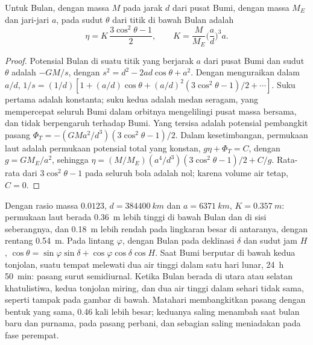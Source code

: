 \begin{theorem}\label{thm:b3:ocean-dynamics:equilibrium-tide}
Untuk Bulan, dengan massa $M$ pada jarak $d$ dari pusat Bumi, dengan
massa $M_E$ dan jari-jari $a$,  pada sudut $\theta$ dari
titik di bawah Bulan adalah
\[
\eta = K\,\frac{3\cos^2\theta - 1}{2},\qquad
K = \frac{M}{M_E}\Big(\frac{a}{d}\Big)^3 a .
\]
\end{theorem}

\begin{proof}
Potensial Bulan di suatu titik yang berjarak $a$ dari
pusat Bumi dan sudut $\theta$ adalah $-GM/s$, dengan $s^2 = d^2 - 2ad\cos\theta +
a^2$. Dengan menguraikan dalam $a/d$, $1/s = (1/d)[1 + (a/d)\cos\theta + (a/d)^2
(3\cos^2\theta - 1)/2 + \cdots]$. Suku pertama adalah konstanta; suku kedua
adalah medan seragam, yang mempercepat seluruh Bumi dalam orbitnya
mengelilingi pusat massa bersama, dan tidak berpengaruh terhadap Bumi.
Yang tersisa adalah potensial pembangkit pasang $\Phi_T = -(GMa^2/d^3)(3
\cos^2\theta - 1)/2$. Dalam kesetimbangan, permukaan laut adalah permukaan
potensial total yang konstan, $g\eta + \Phi_T = C$, dengan $g = GM_E/a^2$, sehingga
$\eta = (M/M_E)(a^4/d^3)(3\cos^2\theta - 1)/2 + C/g$. Rata-rata dari
$3\cos^2\theta - 1$ pada seluruh bola adalah nol; karena volume air
tetap, $C = 0$.
\end{proof}

Dengan rasio massa $0.0123$, $d = \qty{384400}{km}$ dan $a =
\qty{6371}{km}$, $K = \qty{0.357}{m}$: permukaan laut berada \qty{0.36}{m}
lebih tinggi di bawah Bulan dan di sisi seberangnya, dan \qty{0.18}{m} lebih rendah pada
lingkaran besar di antaranya, dengan rentang \qty{0.54}{m}. Pada lintang $\varphi$, dengan
Bulan pada deklinasi $\delta$ dan sudut jam $H$, $\cos\theta =
\sin\varphi\sin\delta + \cos\varphi\cos\delta\cos H$. Saat Bumi berputar
di bawah kedua tonjolan, suatu tempat melewati dua air tinggi dalam satu hari lunar,
\qty{24}{h} \qty{50}{min}: pasang surut semidiurnal. Ketika Bulan berada
di utara atau selatan khatulistiwa, kedua tonjolan miring, dan dua air tinggi
dalam sehari tidak sama, seperti tampak pada gambar di bawah. Matahari membangkitkan
pasang dengan bentuk yang sama, \num{0.46} kali lebih besar; keduanya saling menambah saat bulan baru dan
purnama, pada pasang perbani, dan sebagian saling meniadakan pada fase perempat.

